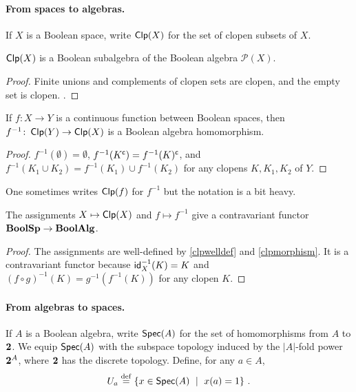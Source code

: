 \paragraph{From spaces to algebras.}
If $X$ is a Boolean space, write $\operatorname*{\mathsf{Clp}}(X)$ for the set of clopen
subsets of $X$. 

\begin{proposition}\label{clpwelldef}
    $\operatorname*{\mathsf{Clp}}(X)$ is a Boolean subalgebra of the Boolean algebra $\mathcal{P}(X)$.
\end{proposition}
\begin{proof}
    Finite unions and complements of clopen sets are clopen, and the empty set
    is clopen.
    .
\end{proof} 
\begin{proposition}\label{clpmorphism}
    If $f \colon X \to Y$ is a continuous function between Boolean spaces, then
    $f^{-1} \colon \operatorname*{\mathsf{Clp}}(Y) \to \operatorname*{\mathsf{Clp}}(X)$ is a Boolean algebra homomorphism.
\end{proposition}
\begin{proof}
    $f^{-1}(\emptyset) = \emptyset$, $f^{-1}(K^{\mathsf{c}}) = f^{-1}(K)^{\mathsf{c}}$, and
    $f^{-1}(K_1 \cup K_2) = f^{-1}(K_1) \cup f^{-1}(K_2)$ for any clopens $K,
    K_1, K_2$ of $Y$. 
\end{proof}
One sometimes writes $\operatorname*{\mathsf{Clp}}(f)$ for $f^{-1}$ but the notation is a bit heavy.
\begin{proposition}
    The assignments $X \mapsto \operatorname*{\mathsf{Clp}}(X)$ and $f \mapsto f^{-1}$ give a
contravariant functor $\mathbf{BoolSp} \to \mathbf{BoolAlg}$.
\end{proposition}
\begin{proof}
    The assignments are well-defined by \cref{clpwelldef} and
    \cref{clpmorphism}. It is a contravariant functor because
    $\mathsf{id}_X^{-1}(K) = K$ and $(f \circ g)^{-1}(K) = g^{-1}(f^{-1}(K))$ for
    any clopen $K$.
\end{proof}

\paragraph{From algebras to spaces.}
If $A$ is a Boolean algebra, write $\operatorname*{\mathsf{Spec}}(A)$ for the set of homomorphisms from
$A$ to $\mathbf{2}$. We equip $\operatorname*{\mathsf{Spec}}(A)$ with the subspace topology induced by the
$|A|$-fold power $\mathbf{2}^{A}$, where $\mathbf{2}$ has the discrete topology.
Define, for any $a \in A$,
\[ U_a \stackrel{\mathrm{def}}{=} \{ x \in \operatorname*{\mathsf{Spec}}(A) \ \mid \ x(a) = 1 \} \ . \]

